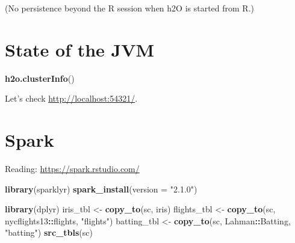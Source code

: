 \documentclass[]{book}
\newenvironment{Shaded}{\begin{snugshade}}{\end{snugshade}}
\newcommand{\KeywordTok}[1]{\textcolor[rgb]{0.13,0.29,0.53}{\textbf{#1}}}
\newcommand{\DataTypeTok}[1]{\textcolor[rgb]{0.13,0.29,0.53}{#1}}
\newcommand{\FloatTok}[1]{\textcolor[rgb]{0.00,0.00,0.81}{#1}}
\newcommand{\StringTok}[1]{\textcolor[rgb]{0.31,0.60,0.02}{#1}}
\newcommand{\OperatorTok}[1]{\textcolor[rgb]{0.81,0.36,0.00}{\textbf{#1}}}
\newcommand{\NormalTok}[1]{#1}
\theoremstyle{definition}
\theoremstyle{definition}
\theoremstyle{definition}
\theoremstyle{remark}
\begin{document}
(No persistence beyond the R session when h2O is started from R.)

\section{State of the JVM}\label{state-of-the-jvm}

\begin{Shaded}
\begin{Highlighting}[]
\KeywordTok{h2o.clusterInfo}\NormalTok{()}
\end{Highlighting}
\end{Shaded}

Let's check \url{http://localhost:54321/}.

\section{Spark}\label{spark}

Reading: \url{https://spark.rstudio.com/}

\begin{Shaded}
\begin{Highlighting}[]
\KeywordTok{library}\NormalTok{(sparklyr)}
\KeywordTok{spark_install}\NormalTok{(}\DataTypeTok{version =} \StringTok{"2.1.0"}\NormalTok{)}
\end{Highlighting}
\end{Shaded}

\begin{Shaded}
\end{Shaded}

\begin{Shaded}
\begin{Highlighting}[]
\KeywordTok{library}\NormalTok{(dplyr)}
\NormalTok{iris_tbl <-}\StringTok{ }\KeywordTok{copy_to}\NormalTok{(sc, iris)}
\NormalTok{flights_tbl <-}\StringTok{ }\KeywordTok{copy_to}\NormalTok{(sc, nycflights13}\OperatorTok{::}\NormalTok{flights, }\StringTok{"flights"}\NormalTok{)}
\NormalTok{batting_tbl <-}\StringTok{ }\KeywordTok{copy_to}\NormalTok{(sc, Lahman}\OperatorTok{::}\NormalTok{Batting, }\StringTok{"batting"}\NormalTok{)}
\KeywordTok{src_tbls}\NormalTok{(sc)}
\end{Highlighting}
\end{Shaded}
\end{document}
